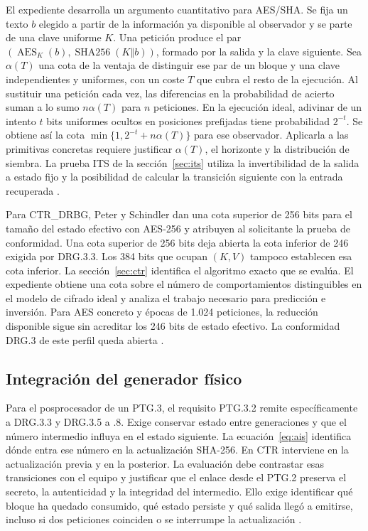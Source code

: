 \documentclass[11pt,a4paper]{article}
\newcommand{\Enc}{\operatorname{AES}}
\newcommand{\HH}{\operatorname{SHA256}}
\newcommand{\cat}{\mathbin\Vert}
\begin{document}
El expediente desarrolla un argumento cuantitativo para AES/SHA. Se fija un texto \(b\) elegido a partir de la información ya disponible al observador y se parte de una clave uniforme \(K\). Una petición produce el par \((\Enc_K(b),\HH(K\cat b))\), formado por la salida y la clave siguiente. Sea \(\alpha(T)\) una cota de la ventaja de distinguir ese par de un bloque y una clave independientes y uniformes, con un coste \(T\) que cubra el resto de la ejecución. Al sustituir una petición cada vez, las diferencias en la probabilidad de acierto suman a lo sumo \(n\alpha(T)\) para \(n\) peticiones. En la ejecución ideal, adivinar de un intento \(t\) bits uniformes ocultos en posiciones prefijadas tiene probabilidad \(2^{-t}\). Se obtiene así la cota \(\min\{1,2^{-t}+n\alpha(T)\}\) para ese observador. Aplicarla a las primitivas concretas requiere justificar \(\alpha(T)\), el horizonte y la distribución de siembra. La prueba ITS de la sección~\ref{sec:its} utiliza la invertibilidad de la salida a estado fijo y la posibilidad de calcular la transición siguiente con la entrada recuperada \cite{expediente}.

Para CTR\_DRBG, Peter y Schindler dan una cota superior de 256 bits para el tamaño del estado efectivo con AES-256 y atribuyen al solicitante la prueba de conformidad. Una cota superior de 256 bits deja abierta la cota inferior de 246 exigida por DRG.3.3. Los 384 bits que ocupan \((K,V)\) tampoco establecen esa cota inferior. La sección~\ref{sec:ctr} identifica el algoritmo exacto que se evalúa. El expediente obtiene una cota sobre el número de comportamientos distinguibles en el modelo de cifrado ideal y analiza el trabajo necesario para predicción e inversión. Para AES concreto y épocas de 1.024 peticiones, la reducción disponible sigue sin acreditar los 246 bits de estado efectivo. La conformidad DRG.3 de este perfil queda abierta \cite[párrs.~102, 207 y 1007]{ais}\cite{expediente}.

\subsection{Integración del generador físico}
Para el posprocesador de un PTG.3, el requisito PTG.3.2 remite específicamente a DRG.3.3 y DRG.3.5 a .8. Exige conservar estado entre generaciones y que el número intermedio influya en el estado siguiente. La ecuación~\eqref{eq:ais} identifica dónde entra ese número en la actualización SHA-256. En CTR interviene en la actualización previa y en la posterior. La evaluación debe contrastar esas transiciones con el equipo y justificar que el enlace desde el PTG.2 preserva el secreto, la autenticidad y la integridad del intermedio. Ello exige identificar qué bloque ha quedado consumido, qué estado persiste y qué salida llegó a emitirse, incluso si dos peticiones coinciden o se interrumpe la actualización \cite[párrs.~131, 134, 371, 375 y 380--383]{ais}.
\end{document}
